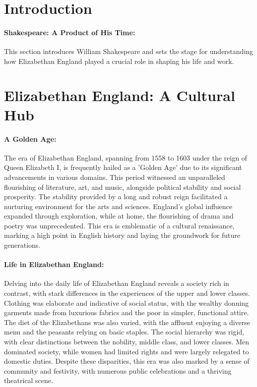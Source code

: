 \documentclass[a4paper,12pt]{book}
\begin{document}
\section*{Introduction}

\paragraph{Shakespeare: A Product of His Time:}
This section introduces William Shakespeare and sets the stage for understanding how Elizabethan England played a crucial role in shaping his life and work.

\section*{Elizabethan England: A Cultural Hub}

\paragraph{A Golden Age:}
The era of Elizabethan England, spanning from 1558 to 1603 under the reign of Queen Elizabeth I, is frequently hailed as a 'Golden Age' due to its significant advancements in various domains. This period witnessed an unparalleled flourishing of literature, art, and music, alongside political stability and social prosperity. The stability provided by a long and robust reign facilitated a nurturing environment for the arts and sciences. England’s global influence expanded through exploration, while at home, the flourishing of drama and poetry was unprecedented. This era is emblematic of a cultural renaissance, marking a high point in English history and laying the groundwork for future generations.

\paragraph{Life in Elizabethan England:}
Delving into the daily life of Elizabethan England reveals a society rich in contrast, with stark differences in the experiences of the upper and lower classes. Clothing was elaborate and indicative of social status, with the wealthy donning garments made from luxurious fabrics and the poor in simpler, functional attire. The diet of the Elizabethans was also varied, with the affluent enjoying a diverse menu and the peasants relying on basic staples. The social hierarchy was rigid, with clear distinctions between the nobility, middle class, and lower classes. Men dominated society, while women had limited rights and were largely relegated to domestic duties. Despite these disparities, this era was also marked by a sense of community and festivity, with numerous public celebrations and a thriving theatrical scene.
\end{document}
